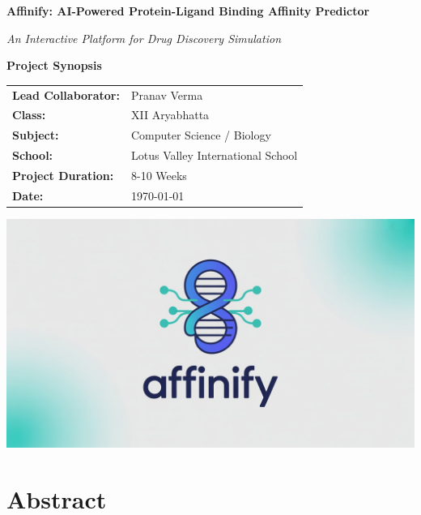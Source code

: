 \documentclass[12pt,a4paper]{article}
\begin{document}
\begin{titlepage}
\centering
\vspace*{2cm}

{\Huge\bfseries Affinify: AI-Powered Protein-Ligand Binding Affinity Predictor}

\vspace{1.5cm}

{\Large\textit{An Interactive Platform for Drug Discovery Simulation}}

\vspace{1cm}

{\large\textbf{Project Synopsis}}

\vspace{2cm}

\begin{tabular}{ll}
\textbf{Lead Collaborator:} & Pranav Verma \\
\textbf{Class:} & XII Aryabhatta \\
\textbf{Subject:} & Computer Science / Biology \\
\textbf{School:} & Lotus Valley International School \\
\textbf{Project Duration:} & 8-10 Weeks \\
\textbf{Date:} & \today
\end{tabular}

\vspace{2cm}

\includegraphics[width=1\textwidth]{../../Logo/logo-banner.jpeg}

\vfill

\end{titlepage}

\tableofcontents
\newpage

\section{Abstract}
\end{document}

